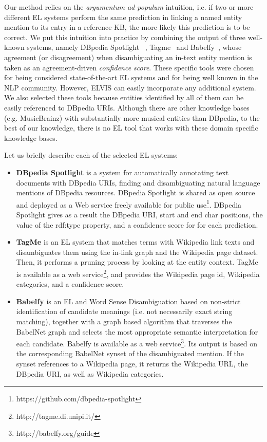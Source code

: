 Our method relies on the \textit{argumentum ad populum} intuition, i.e. if two or more different EL systems perform the same prediction in linking a named entity mention to its entry in a reference KB, the more likely this prediction is to be correct. We put this intuition into practice by combining the output of three well-known systems, namely DBpedia Spotlight~\cite{Mendes2011} , Tagme~\cite{Ferragina2012} and Babelfy~\cite{Moroetal2014b}, whose agreement (or disagreement) when disambiguating an in-text entity mention is taken as an agreement-driven \textit{confidence score}. These specific tools were chosen for being considered state-of-the-art EL systems and for being well known in the NLP community. However, \textsc{ELVIS} can easily incorporate any additional system. We also selected these tools because entities identified by all of them can be easily referenced to DBpedia URIs. Although there are other knowledge bases (e.g. MusicBrainz) with substantially more musical entities than DBpedia, to the best of our knowledge, there is no EL tool that works with these domain specific knowledge bases. 

Let us briefly describe each of the selected EL systems:
\begin{itemize}
\item \textbf{DBpedia Spotlight} \cite{Mendes2011} is a system for automatically annotating text documents with DBpedia URIs, finding and disambiguating natural language mentions of DBpedia resources. DBpedia Spotlight is shared as open source and deployed as a Web service freely available for public use\footnote{https://github.com/dbpedia-spotlight}.
DBpedia Spotlight gives as a result the DBpedia URI, start and end char positions, the value of the rdf:type property, and a confidence score for for each prediction.
\item \textbf{TagMe} \cite{Ferragina2012} is an EL system that matches terms with Wikipedia link texts and disambiguates them using the in-link graph and the Wikipedia page dataset. Then, it performs a pruning process by looking at the entity context. TagMe is available as a web service\footnote{http://tagme.di.unipi.it/}, and provides the Wikipedia page id, Wikipedia categories, and a confidence score. 
\item \textbf{Babelfy} \cite{Moroetal2014b} is an EL and Word Sense Disambiguation based on non-strict identification of candidate meanings (i.e. not necessarily exact string matching), together with a graph based algorithm that traverses the BabelNet graph and selects the most appropriate semantic interpretation for each candidate. Babelfy is available as a web service\footnote{http://babelfy.org/guide}. Its output is based on the corresponding BabelNet synset of the disambiguated mention. If the synset references to a Wikipedia page, it returns the Wikipedia URL, the DBpedia URI, as well as Wikipedia categories.
\end{itemize}


